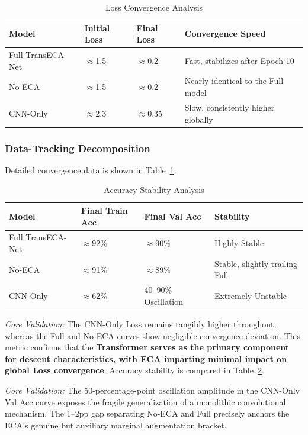 \documentclass[sigconf]{acmart}
\begin{document}
\begin{table}[!t]
\caption{Loss Convergence Analysis}
\label{tab:loss_conv}
\begin{tabular}{p{4.0cm}p{2.5cm}p{2.5cm}p{7.4cm}}
\toprule
\textbf{Model} & \textbf{Initial Loss} & \textbf{Final Loss} & \textbf{Convergence Speed} \\
\midrule
Full TransECA-Net & $\approx$1.5 & $\approx$0.2 & Fast, stabilizes after Epoch 10 \\
No-ECA & $\approx$1.5 & $\approx$0.2 & Nearly identical to the Full model \\
CNN-Only & $\approx$2.3 & $\approx$0.35 & Slow, consistently higher globally \\
\bottomrule
\end{tabular}
\end{table}

\subsubsection{Data-Tracking Decomposition} Detailed convergence data is shown in Table~\ref{tab:loss_conv}.


\begin{table}[!t]
\caption{Accuracy Stability Analysis}
\label{tab:acc_stab}
\begin{tabular}{p{4.0cm}p{3.0cm}p{3.5cm}p{5.9cm}}
\toprule
\textbf{Model} & \textbf{Final Train Acc} & \textbf{Final Val Acc} & \textbf{Stability} \\
\midrule
Full TransECA-Net & $\approx$92\% & $\approx$90\% & Highly Stable \\
No-ECA & $\approx$91\% & $\approx$89\% & Stable, slightly trailing Full \\
CNN-Only & $\approx$62\% & 40--90\% Oscillation & Extremely Unstable \\
\bottomrule
\end{tabular}
\end{table}

\textit{Core Validation:} The CNN-Only Loss remains tangibly higher throughout, whereas the Full and No-ECA curves show negligible convergence deviation. This metric confirms that the \textbf{Transformer serves as the primary component for descent characteristics, with ECA imparting minimal impact on global Loss convergence}. Accuracy stability is compared in Table~\ref{tab:acc_stab}.

\textit{Core Validation:} The 50-percentage-point oscillation amplitude in the CNN-Only Val Acc curve exposes the fragile generalization of a monolithic convolutional mechanism. The 1--2pp gap separating No-ECA and Full precisely anchors the ECA's genuine but auxiliary marginal augmentation bracket.
\end{document}
